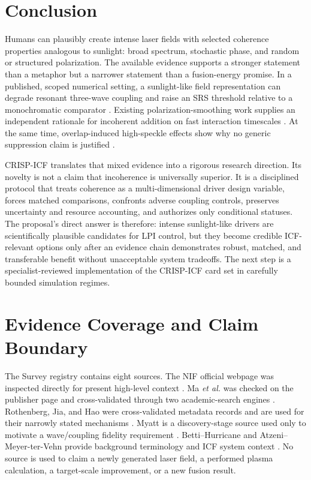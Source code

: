 \documentclass[conference]{../../../../Conference-LaTeX-template_10-17-19/IEEEtran}
\begin{document}
\section{Conclusion}
Humans can plausibly create intense laser fields with selected coherence properties analogous to sunlight: broad spectrum, stochastic phase, and random or structured polarization. The available evidence supports a stronger statement than a metaphor but a narrower statement than a fusion-energy promise. In a published, scoped numerical setting, a sunlight-like field representation can degrade resonant three-wave coupling and raise an SRS threshold relative to a monochromatic comparator \cite{ma2021}. Existing polarization-smoothing work supplies an independent rationale for incoherent addition on fast interaction timescales \cite{rothenberg2000}. At the same time, overlap-induced high-speckle effects show why no generic suppression claim is justified \cite{hao2023}.

CRISP-ICF translates that mixed evidence into a rigorous research direction. Its novelty is not a claim that incoherence is universally superior. It is a disciplined protocol that treats coherence as a multi-dimensional driver design variable, forces matched comparisons, confronts adverse coupling controls, preserves uncertainty and resource accounting, and authorizes only conditional statuses. The proposal's direct answer is therefore: intense sunlight-like drivers are scientifically plausible candidates for LPI control, but they become credible ICF-relevant options only after an evidence chain demonstrates robust, matched, and transferable benefit without unacceptable system tradeoffs. The next step is a specialist-reviewed implementation of the CRISP-ICF card set in carefully bounded simulation regimes.

\appendices
\section{Evidence Coverage and Claim Boundary}
The Survey registry contains eight sources. The NIF official webpage was inspected directly for present high-level context \cite{nif_2026}. Ma \emph{et al.} was checked on the publisher page and cross-validated through two academic-search engines \cite{ma2021}. Rothenberg, Jia, and Hao were cross-validated metadata records and are used for their narrowly stated mechanisms \cite{rothenberg2000,jia2023,hao2023}. Myatt is a discovery-stage source used only to motivate a wave/coupling fidelity requirement \cite{myatt2017}. Betti--Hurricane and Atzeni--Meyer-ter-Vehn provide background terminology and ICF system context \cite{betti2016,atzeni2004}. No source is used to claim a newly generated laser field, a performed plasma calculation, a target-scale improvement, or a new fusion result.
\end{document}
